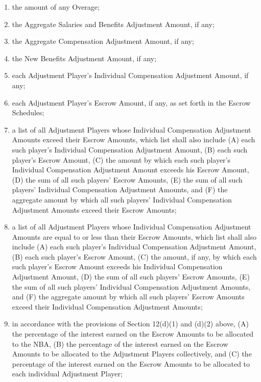\documentclass[
]{book}
\providecommand{\tightlist}{%
  \setlength{\itemsep}{0pt}\setlength{\parskip}{0pt}}
\begin{document}
\begin{enumerate}
\begin{enumerate}
    \begin{enumerate}
    \def\labelenumiii{(\roman{enumiii})}
    \tightlist
    \item
      the amount of any Overage;
    \item
      the Aggregate Salaries and Benefits Adjustment Amount, if any;
    \item
      the Aggregate Compensation Adjustment Amount, if any;
    \item
      the New Benefits Adjustment Amount, if any;
    \item
      each Adjustment Player's Individual Compensation Adjustment Amount, if any;
    \item
      each Adjustment Player's Escrow Amount, if any, as set forth in the Escrow Schedules;
    \item
      a list of all Adjustment Players whose Individual Compensation Adjustment Amounts exceed their Escrow Amounts, which list shall also include (A) each such player's Individual Compensation Adjustment Amount, (B) each such player's Escrow Amount, (C) the amount by which each such player's Individual Compensation Adjustment Amount exceeds his Escrow Amount, (D) the sum of all such players' Escrow Amounts, (E) the sum of all such players' Individual Compensation Adjustment Amounts, and (F) the aggregate amount by which all such players' Individual Compensation Adjustment Amounts exceed their Escrow Amounts;
    \item
      a list of all Adjustment Players whose Individual Compensation Adjustment Amounts are equal to or less than their Escrow Amounts, which list shall also include (A) each such player's Individual Compensation Adjustment Amount, (B) each such player's Escrow Amount, (C) the amount, if any, by which each such player's Escrow Amount exceeds his Individual Compensation Adjustment Amount, (D) the sum of all such players' Escrow Amounts, (E) the sum of all such players' Individual Compensation Adjustment Amounts, and (F) the aggregate amount by which all such players' Escrow Amounts exceed their Individual Compensation Adjustment Amounts;
    \item
      in accordance with the provisions of Section 12(d)(1) and (d)(2) above, (A) the percentage of the interest earned on the Escrow Amounts to be allocated to the NBA, (B) the percentage of the interest earned on the Escrow Amounts to be allocated to the Adjustment Players collectively, and (C) the percentage of the interest earned on the Escrow Amounts to be allocated to each individual Adjustment Player;

\end{enumerate}
\end{enumerate}
\end{enumerate}
\end{document}

